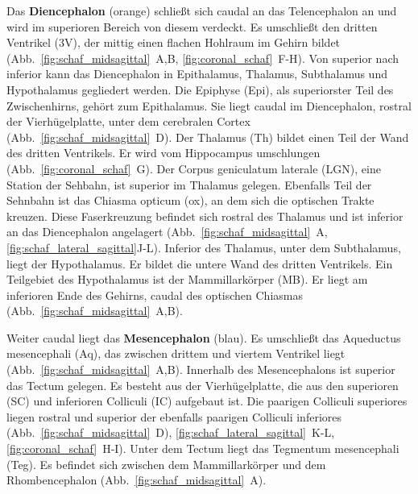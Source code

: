\documentclass[12pt,a4paper,pdftex]{article}
\begin{document}
\noindent Das \textbf{Diencephalon} (orange) schließt sich caudal an das Telencephalon an und wird im superioren Bereich von diesem verdeckt. Es umschließt den dritten Ventrikel (3V), der mittig einen flachen Hohlraum im Gehirn bildet (Abb.~\ref{fig:schaf_midsagittal}~A,B, \ref{fig:coronal_schaf}~F-H). Von superior nach inferior kann das Diencephalon in Epithalamus, Thalamus, Subthalamus und Hypothalamus gegliedert werden. Die Epiphyse (Epi), als superiorster Teil des Zwischenhirns, gehört zum Epithalamus. Sie liegt caudal im Diencephalon, rostral der Vierhügelplatte, unter dem cerebralen Cortex (Abb.~\ref{fig:schaf_midsagittal}~D). Der Thalamus (Th) bildet einen Teil der Wand des dritten Ventrikels. Er wird vom Hippocampus umschlungen (Abb.~\ref{fig:coronal_schaf}~G). Der Corpus geniculatum laterale (LGN), eine Station der Sehbahn, ist superior im Thalamus gelegen. Ebenfalls Teil der Sehnbahn ist das Chiasma opticum (ox), an dem sich die optischen Trakte kreuzen. Diese Faserkreuzung befindet sich rostral des Thalamus und ist inferior an das Diencephalon angelagert (Abb.~\ref{fig:schaf_midsagittal}~A, \ref{fig:schaf_lateral_sagittal}J-L). Inferior des Thalamus, unter dem Subthalamus, liegt der Hypothalamus. Er bildet die untere Wand des dritten Ventrikels. Ein Teilgebiet des Hypothalamus ist der Mammillarkörper (MB). Er liegt am inferioren Ende des Gehirns, caudal des optischen Chiasmas (Abb.~\ref{fig:schaf_midsagittal}~A,B).

\noindent Weiter caudal liegt das \textbf{Mesencephalon} (blau). Es umschließt das Aqueductus mesencephali (Aq), das zwischen drittem und viertem Ventrikel liegt (Abb.~\ref{fig:schaf_midsagittal}~A,B). Innerhalb des Mesencephalons ist superior das Tectum gelegen. Es besteht aus der Vierhügelplatte, die aus den superioren (SC) und inferioren Colliculi (IC) aufgebaut ist. Die paarigen Colliculi superiores liegen rostral und superior der ebenfalls paarigen Colliculi inferiores (Abb.~\ref{fig:schaf_midsagittal}~D), \ref{fig:schaf_lateral_sagittal}~K-L, \ref{fig:coronal_schaf}~H-I). Unter dem Tectum liegt das Tegmentum mesencephali (Teg). Es befindet sich zwischen dem Mammillarkörper und dem Rhombencephalon (Abb.~\ref{fig:schaf_midsagittal}~A).
\end{document}
